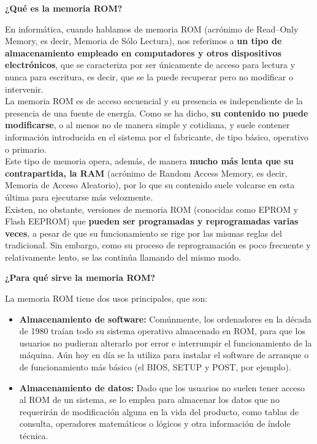 \documentclass[10pt,letterpaper]{article}
\begin{document}
\begin{justify}
\begin{itemize}
		\end{itemize}
	
	\begin{center}
		\textbf{¿Qué es la memoria ROM?}
	\end{center}
	En informática, cuando hablamos de memoria ROM (acrónimo de Read–Only Memory, es decir, Memoria de Sólo Lectura), nos referimos a \textbf{un tipo de almacenamiento empleado en computadores y otros dispositivos electrónicos}, que se caracteriza por ser únicamente de acceso para lectura y nunca para escritura, es decir, que se la puede recuperar pero no modificar o intervenir. \\
	
	\noindent
	La memoria ROM es de acceso secuencial y su presencia es independiente de la presencia de una fuente de energía. Como se ha dicho, \textbf{su contenido no puede modificarse}, o al menos no de manera simple y cotidiana, y suele contener información introducida en el sistema por el fabricante, de tipo básico, operativo o primario. \\
	
	\noindent
	Este tipo de memoria opera, además, de manera \textbf{mucho más lenta que su contrapartida, la RAM} (acrónimo de Random Access Memory, es decir, Memoria de Acceso Aleatorio), por lo que su contenido suele volcarse en esta última para ejecutarse más velozmente. \\
	
	\noindent
	Existen, no obstante, versiones de memoria ROM (conocidas como EPROM y Flash EEPROM) que \textbf{pueden ser programadas y reprogramadas varias veces}, a pesar de que su funcionamiento se rige por las mismas reglas del tradicional. Sin embargo, como su proceso de reprogramación es poco frecuente y relativamente lento, se las continúa llamando del mismo modo.\\
	
	\newpage
	\begin{center}
		\textbf{¿Para qué sirve la memoria ROM?}
	\end{center}
	
	\noindent
	La memoria ROM tiene dos usos principales, que son:\\
	
	\begin{itemize}
		\item \textbf{Almacenamiento de software:} Comúnmente, los ordenadores en la década de 1980 traían todo su sistema operativo almacenado en ROM, para que los usuarios no pudieran alterarlo por error e interrumpir el funcionamiento de la máquina. Aún hoy en día se la utiliza para instalar el software de arranque o de funcionamiento más básico (el BIOS, SETUP y POST, por ejemplo).
		\item \textbf{Almacenamiento de datos:} Dado que los usuarios no suelen tener acceso al ROM de un sistema, se lo emplea para almacenar los datos que no requerirán de modificación alguna en la vida del producto, como tablas de consulta, operadores matemáticos o lógicos y otra información de índole técnica.
	\end{itemize}
	

\end{justify}
\end{document}
